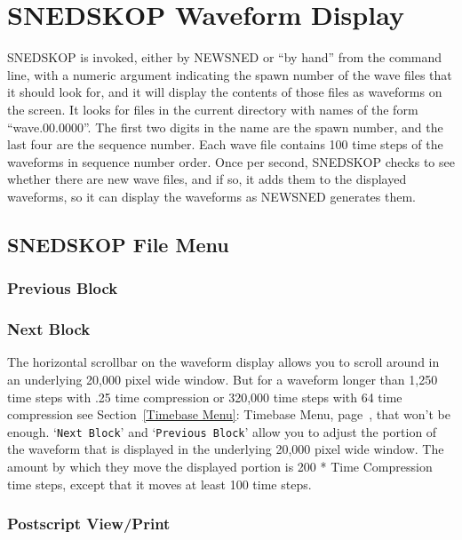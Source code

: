 \documentclass[12pt,openany,oneside]{book}
\newcommand{\tisamp}[1]{`\texttt{#1}'}
\newcommand{\tixref}[1]{see Section~\ref{#1}: #1, page~\pageref{#1}}
\begin{document}
\section{SNEDSKOP Waveform Display}
\label{SNEDSKOP Waveform Display}

SNEDSKOP is invoked, either by NEWSNED or ``by hand'' from the command
line, with a numeric argument indicating the spawn number of the wave
files that it should look for, and it will display the contents of
those files as waveforms on the screen.  It looks for files in the
current directory with names of the form ``wave.00.0000''.  The first
two digits in the name are the spawn number, and the last four are the
sequence number.  Each wave file contains 100 time steps of the
waveforms in sequence number order.  Once per second, SNEDSKOP checks
to see whether there are new wave files, and if so, it adds them to
the displayed waveforms, so it can display the waveforms as NEWSNED
generates them.
\filbreak

\subsection{SNEDSKOP File Menu}

\subsubsection*{Previous Block}
\subsubsection*{Next Block}
\label{Block}

The horizontal scrollbar on the waveform display allows you to scroll
around in an underlying 20,000 pixel wide window.  But for a waveform
longer than 1,250 time steps with .25 time compression or 320,000 time
steps with 64 time compression \tixref{Timebase Menu}, that
won't be enough.  \tisamp{Next Block} and \tisamp{Previous Block} allow
you to adjust the portion of the waveform that is displayed in the
underlying 20,000 pixel wide window.  The amount by which they move
the displayed portion is 200 * Time Compression time steps, except
that it moves at least 100 time steps.
\vfill

\subsubsection*{Postscript View/Print}
\label{Postscript View/Print}
\end{document}
